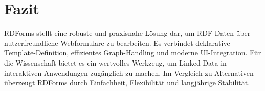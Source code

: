 \documentclass[11pt,a4paper]{article}
\begin{document}
\section{Fazit}
RDForms stellt eine robuste und praxisnahe Lösung dar, um RDF-Daten über nutzerfreundliche Webformulare zu bearbeiten. 
Es verbindet deklarative Template-Definition, effizientes Graph-Handling und moderne UI-Integration. 
Für die Wissenschaft bietet es ein wertvolles Werkzeug, um Linked Data in interaktiven Anwendungen zugänglich zu machen. 
Im Vergleich zu Alternativen überzeugt RDForms durch Einfachheit, Flexibilität und langjährige Stabilität.

\printbibliography
\end{document}
